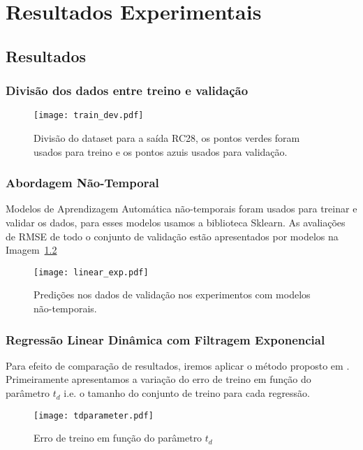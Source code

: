 \chapter{Resultados Experimentais }
\label{cap:resultados}

\section{Resultados}

\subsection{Divisão dos dados entre treino e validação}

\begin{figure}[H]
  \centering
  \texttt{[image: train\_dev.pdf]}
  \caption{Divisão do dataset para a saída RC28, os pontos verdes foram usados para
    treino e os pontos azuis usados para validação.}
  \label{fig:divrc28}
\end{figure}

\subsection{Abordagem Não-Temporal}

Modelos de Aprendizagem Automática não-temporais foram usados para treinar e validar os dados, para esses modelos usamos a biblioteca Sklearn.
As avaliações de RMSE de todo o conjunto de validação estão apresentados por modelos na Imagem~\ref{fig:linmodels}  

\begin{figure}[H]
  \centering
\texttt{[image: linear\_exp.pdf]}
\caption{Predições nos dados de validação nos experimentos com modelos não-temporais. }
\label{fig:linmodels}
\end{figure}

\subsection{Regressão Linear Dinâmica com Filtragem Exponencial}

Para efeito de comparação de resultados, iremos aplicar o método proposto em
\citep{grecialin}. Primeiramente apresentamos a variação do erro de treino em
função do parâmetro $t_d$ i.e. o tamanho do conjunto de treino para cada
regressão.

\begin{figure}[H]
  \centering
  \texttt{[image: tdparameter.pdf]}
  \caption{Erro de treino em função do parâmetro $t_d$}
  \label{fig:tdparam}
\end{figure}

